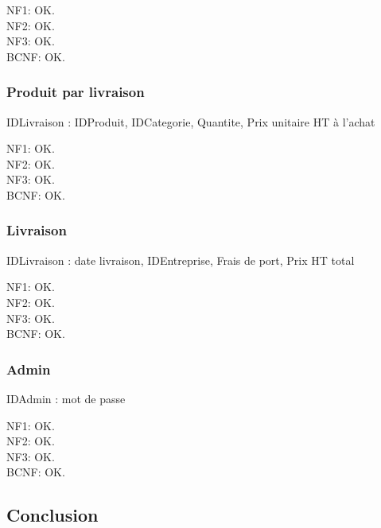 \documentclass[a4paper, 12pt]{report}
\begin{document}
\begin{spacing}{1.2}
NF1: OK.\\
NF2: OK.\\
NF3: OK.\\
BCNF: OK.\\

\textcolor{colortitre3}{\subsubsection*{\hypertarget{ppl}{Produit par livraison}}}

IDLivraison : IDProduit, IDCategorie, Quantite, Prix unitaire HT à l'achat

NF1: OK.\\
NF2: OK.\\
NF3: OK.\\
BCNF: OK.\\

\textcolor{colortitre3}{\subsubsection*{\hypertarget{Livraison}{Livraison}}}

IDLivraison : date livraison, IDEntreprise, Frais de port, Prix HT total

NF1: OK.\\
NF2: OK.\\
NF3: OK.\\
BCNF: OK.\\

\textcolor{colortitre3}{\subsubsection*{\hypertarget{Admin}{Admin}}}

IDAdmin : mot de passe

NF1: OK.\\
NF2: OK.\\
NF3: OK.\\
BCNF: OK.\\

\newpage
\textcolor{colortitre1}{\section*{Conclusion}} 



\end{spacing}
\end{document}
